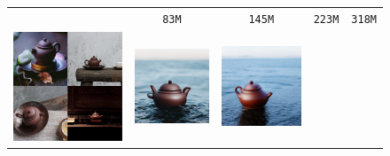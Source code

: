 \begin{figure}[!ht]
\begin{tabular}[t]{c c c c c}
    & \texttt{83M} & \texttt{145M} & \texttt{223M} & \texttt{318M} \\
    \multirow[t]{3}{*}{
    \includegraphics[width=0.3\linewidth]{cp2/figures/dreambooth/teapot/teapot.pdf}
    } &
    \includegraphics[width=\xwidth]{cp2/figures/dreambooth/teapot/c224_checkpoint_399.png} &
    \includegraphics[width=\xwidth]{cp2/figures/dreambooth/teapot/c256_checkpoint_599.png} &

\end{tabular}
\end{figure}
